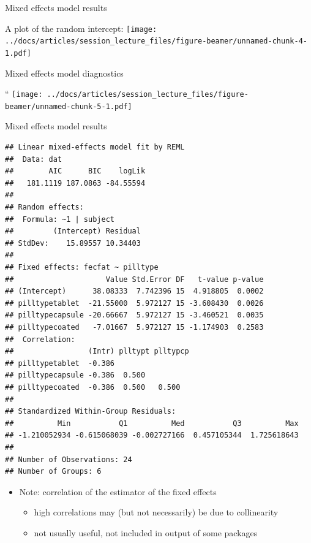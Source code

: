 \documentclass[
  ignorenonframetext,
]{beamer}
\providecommand{\tightlist}{%
  \setlength{\itemsep}{0pt}\setlength{\parskip}{0pt}}
\begin{document}
\begin{frame}{Mixed effects model results}
\protect\hypertarget{mixed-effects-model-results}{}

A plot of the random intercept:
\texttt{[image: ../docs/articles/session\_lecture\_files/figure-beamer/unnamed-chunk-4-1.pdf]}

\end{frame}

\begin{frame}{Mixed effects model diagnostics}
\protect\hypertarget{mixed-effects-model-diagnostics}{}

``
\texttt{[image: ../docs/articles/session\_lecture\_files/figure-beamer/unnamed-chunk-5-1.pdf]}

\end{frame}

\begin{frame}[fragile]{Mixed effects model results}
\protect\hypertarget{mixed-effects-model-results-1}{}

\tiny

\begin{verbatim}
## Linear mixed-effects model fit by REML
##  Data: dat 
##        AIC      BIC    logLik
##   181.1119 187.0863 -84.55594
## 
## Random effects:
##  Formula: ~1 | subject
##         (Intercept) Residual
## StdDev:    15.89557 10.34403
## 
## Fixed effects: fecfat ~ pilltype 
##                     Value Std.Error DF   t-value p-value
## (Intercept)      38.08333  7.742396 15  4.918805  0.0002
## pilltypetablet  -21.55000  5.972127 15 -3.608430  0.0026
## pilltypecapsule -20.66667  5.972127 15 -3.460521  0.0035
## pilltypecoated   -7.01667  5.972127 15 -1.174903  0.2583
##  Correlation: 
##                 (Intr) plltypt plltypcp
## pilltypetablet  -0.386                 
## pilltypecapsule -0.386  0.500          
## pilltypecoated  -0.386  0.500   0.500  
## 
## Standardized Within-Group Residuals:
##          Min           Q1          Med           Q3          Max 
## -1.210052934 -0.615068039 -0.002727166  0.457105344  1.725618643 
## 
## Number of Observations: 24
## Number of Groups: 6
\end{verbatim}

\normalsize

\begin{itemize}
\tightlist
\item
  Note: correlation of the estimator of the fixed effects

  \begin{itemize}
  \tightlist
  \item
    high correlations may (but not necessarily) be due to collinearity
  \item
    not usually useful, not included in output of some packages
  \end{itemize}
\end{itemize}

\end{frame}
\end{document}
